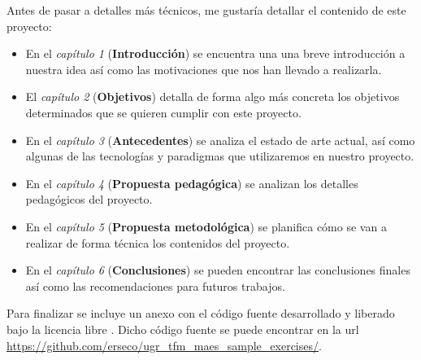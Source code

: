 \bigskip
Antes de pasar a detalles más técnicos, me gustaría detallar el contenido de este proyecto:

\begin{itemize}
  \item En el \textit{capítulo 1} (\textbf{Introducción}) se encuentra una una breve introducción a nuestra idea así como las motivaciones que nos han llevado a realizarla.
  \item El \textit{capítulo 2} (\textbf{Objetivos}) detalla de forma algo más concreta los objetivos determinados que se quieren cumplir con este proyecto.
  \item En el \textit{capítulo 3} (\textbf{Antecedentes}) se analiza el estado de arte actual, así como algunas de las tecnologías y paradigmas que utilizaremos en nuestro proyecto.
  \item En el \textit{capítulo 4} (\textbf{Propuesta pedagógica}) se analizan los detalles pedagógicos del proyecto.
  \item En el \textit{capítulo 5} (\textbf{Propuesta metodológica}) se planifica cómo se van a realizar de forma técnica los contenidos del proyecto.
  \item En el \textit{capítulo 6} (\textbf{Conclusiones}) se pueden encontrar las conclusiones finales así como las recomendaciones para futuros trabajos.

\end{itemize}


\bigskip
Para finalizar se incluye un anexo con el código fuente desarrollado y liberado bajo la licencia libre \cite{gplv3}. Dicho código fuente se puede encontrar en la url \url{https://github.com/erseco/ugr_tfm_maes_sample_exercises/}.







